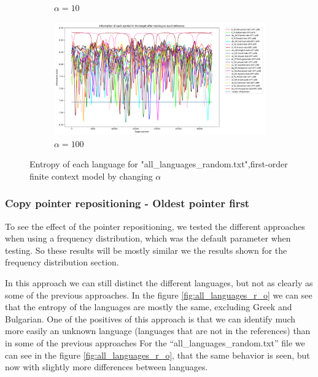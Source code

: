 \documentclass{article}
\begin{document}
\begin{figure}
\begin{subfigure}[b]{0.3\textwidth}
\begin{center}
        \end{center}
        \caption{$\alpha = 10$}
        \label{fig:all_languages_random_p_c:10:3}
    \end{subfigure}
    \hfill
    \begin{subfigure}[b]{0.3\textwidth}
        \begin{center}
            \includegraphics[width=1.0\linewidth]{../results/all_languages_random/-p_c:100:3.png}
        \end{center}
        \caption{$\alpha = 100$}
        \label{fig:all_languages_random_p_c:100:3}
    \end{subfigure}
    
    \caption{Entropy of each language for "all_languages_random.txt",first-order finite context model by changing $\alpha$}
    \label{fig:all_languages_random_p_c:alpha}
\end{figure}


\subsubsection{Copy pointer repositioning - Oldest pointer first}
\label{subsubsec:results_locate_lang_oldest_pointer_first}

To see the effect of the pointer repositioning, we tested the different approaches when using a frequency distribution, which was the default parameter when testing.
So these results will be mostly similar we the results shown for the frequency distribution section.

In this approach we can still distinct the different languages, but not as clearly as some of the previous approaches.
In the figure \ref{fig:all_languages_r_o} we can see that the entropy of the languages are mostly the same, excluding Greek and Bulgarian.
One of the positives of this approach is that we can identify much more easily an unknown language (languages that are not in the references) than in some of the previous approaches
For the “all_languages_random.txt” file we can see in the figure \ref{fig:all_languages_r_o}, that the same behavior is seen, but now with slightly more differences between languages.
\end{document}
